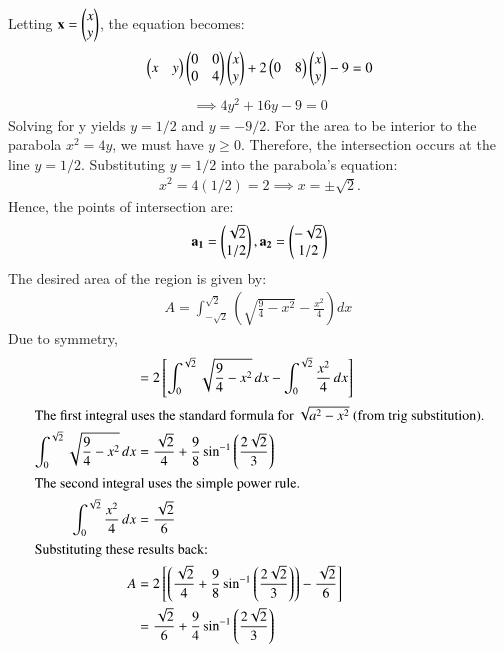 \documentclass[article]{IEEEtran}
\begin{document}
Letting $\mathbf{x} = \begin{pmatrix}x \\ y\end{pmatrix}$, the equation becomes:
\begin{align} \begin{pmatrix}x & y\end{pmatrix} \begin{pmatrix}0 & 0 \\ 0 & 4\end{pmatrix} \begin{pmatrix}x \\ y\end{pmatrix} + 2 \begin{pmatrix}0 & 8\end{pmatrix} \begin{pmatrix}x \\ y\end{pmatrix} - 9 = 0 \end{align}
\begin{align} \implies 4y^2 + 16y - 9 = 0 \end{align}
Solving for y yields $y = 1/2$ and $y = -9/2$. For the area to be interior to the parabola $x^2 = 4y$, we must have $y \ge 0$. Therefore, the intersection occurs at the line $y = 1/2$. Substituting $y = 1/2$ into the parabola's equation:
\begin{align} x^2 = 4(1/2) = 2 \implies x = \pm\sqrt{2}. \end{align}
Hence, the points of intersection are:
\begin{align} 
\mathbf{a_1} = \begin{pmatrix}\sqrt{2} \\ 1/2\end{pmatrix}, \mathbf{a_2} = \begin{pmatrix}-\sqrt{2} \\ 1/2\end{pmatrix}
\end{align}
The desired area of the region is given by:
\begin{align} A = \int_{-\sqrt{2}}^{\sqrt{2}} \left( \sqrt{\frac{9}{4} - x^2} - \frac{x^2}{4} \right) dx \
\end{align}
Due to symmetry,
\begin{align}
	&= 2 \left[ \int_{0}^{\sqrt{2}} \sqrt{\frac{9}{4} - x^2} \, dx - \int_{0}^{\sqrt{2}} \frac{x^2}{4} \, dx \right] \\
	\intertext{The first integral uses the standard formula for $\sqrt{a^2-x^2}$ (from trig substitution).}
	\int_{0}^{\sqrt{2}} \sqrt{\frac{9}{4} - x^2} \, dx &= \frac{\sqrt{2}}{4} + \frac{9}{8}\sin^{-1}\left(\frac{2\sqrt{2}}{3}\right) \\
	\intertext{The second integral uses the simple power rule.}
	\int_{0}^{\sqrt{2}} \frac{x^2}{4} \, dx &= \frac{\sqrt{2}}{6} \\
	\intertext{Substituting these results back:}
	A &= 2 \left[ \left( \frac{\sqrt{2}}{4} + \frac{9}{8}\sin^{-1}\left(\frac{2\sqrt{2}}{3}\right) \right) - \frac{\sqrt{2}}{6} \right] \\
	&= \frac{\sqrt{2}}{6} + \frac{9}{4}\sin^{-1}\left(\frac{2\sqrt{2}}{3}\right)
\end{align}
\end{document}

